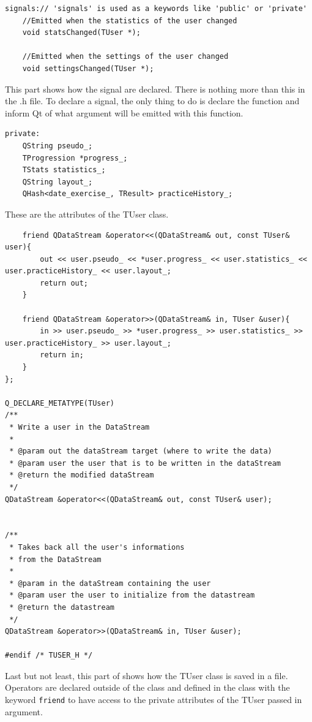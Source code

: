 \begin{lstlisting}
signals:// 'signals' is used as a keywords like 'public' or 'private'
	//Emitted when the statistics of the user changed
    void statsChanged(TUser *);

	//Emitted when the settings of the user changed
    void settingsChanged(TUser *);
\end{lstlisting}
This part shows how the signal are declared. There is nothing more than this in the .h file. To declare a signal, the only thing to do is declare the function and inform Qt of what argument will be emitted with this function.

\begin{lstlisting}
private:
    QString pseudo_;
    TProgression *progress_;
    TStats statistics_;
    QString layout_;
	QHash<date_exercise_, TResult> practiceHistory_;
\end{lstlisting}
These are the attributes of the TUser class.

\begin{lstlisting}
    friend QDataStream &operator<<(QDataStream& out, const TUser& user){
        out << user.pseudo_ << *user.progress_ << user.statistics_ << user.practiceHistory_ << user.layout_;
        return out;
    }

    friend QDataStream &operator>>(QDataStream& in, TUser &user){
        in >> user.pseudo_ >> *user.progress_ >> user.statistics_ >> user.practiceHistory_ >> user.layout_;
        return in;
    }
};

Q_DECLARE_METATYPE(TUser)
/**
 * Write a user in the DataStream
 * 
 * @param out the dataStream target (where to write the data)
 * @param user the user that is to be written in the dataStream
 * @return the modified dataStream
 */
QDataStream &operator<<(QDataStream& out, const TUser& user);


/**
 * Takes back all the user's informations
 * from the DataStream
 * 
 * @param in the dataStream containing the user
 * @param user the user to initialize from the datastream
 * @return the datastream
 */
QDataStream &operator>>(QDataStream& in, TUser &user);

#endif /* TUSER_H */

\end{lstlisting}
Last but not least, this part of shows how the TUser class is saved in a file. Operators are declared outside of the class and defined in the class with the keyword \texttt{friend} to have access to the private attributes of the TUser passed in argument.

